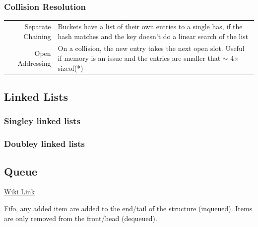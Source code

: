 {\subsubsection{Collision Resolution}
\begin{tabular}{r p{}}
	Separate Chaining&Buckets have a list of their own entries to a single has, if the hash matches and the key doesn't do a linear search of the list\\
	Open Addressing&On a collision, the new entry takes the next open slot. Useful if memory is an issue and the entries are smaller that $\sim$ 4$\times$ sizeof(*)\\

\end{tabular}

\subsection{Linked Lists}
\subsubsection{Singley linked lists}
\begin{center}
\end{center}
\subsubsection{Doubley linked lists}


\subsection{Queue}

\href{https://en.wikipedia.org/wiki/Queue_(abstract_data_type)}{Wiki Link}

Fifo, any added item are added to the end/tail of the structure (inqueued). Items are only removed from the front/head (dequeued). 

}
